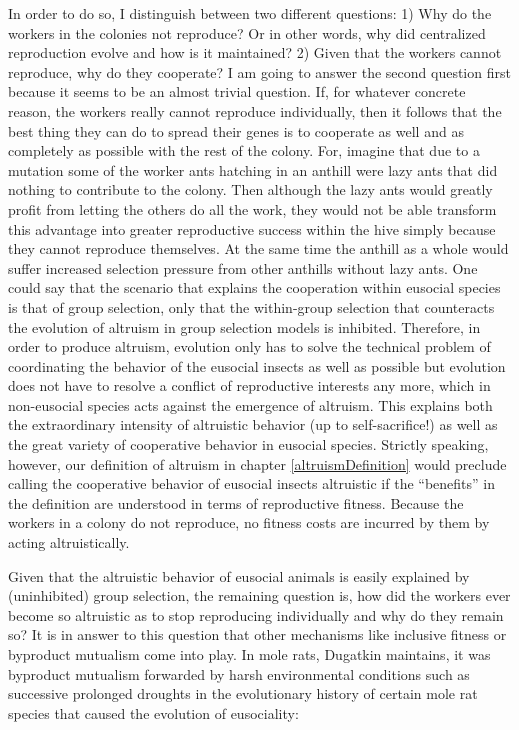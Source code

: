 In order to do so, I distinguish between two different questions: 1) Why
do the workers in the colonies not reproduce? Or in other words,
why did centralized reproduction evolve and how is it maintained? 2) Given
that the workers cannot reproduce, why do they cooperate? I am
going to answer the second question first because it seems to be an almost
trivial question. If, for whatever concrete reason, the workers really cannot
reproduce individually, then it follows that the best thing they can
do to spread their genes is to cooperate as well and as completely as possible
with the rest of the colony. For, imagine that due to a mutation some of the
worker ants hatching in an anthill were lazy ants that did nothing to
contribute to the colony. Then although the lazy ants would greatly profit
from letting the others do all the work, they would not be able transform this
advantage into greater reproductive success within the hive simply because
they cannot reproduce themselves. At the same time the anthill as a whole
would suffer increased selection pressure from other anthills without lazy
ants. One could say that the scenario that explains the cooperation within
eusocial species is that of group selection, only that the within-group
selection that counteracts the evolution of altruism in group selection models
is inhibited.  Therefore, in order to produce altruism, evolution only has to
solve the technical problem of coordinating the behavior of the eusocial
insects as well as possible but evolution does not have to resolve a conflict
of reproductive interests any more, which in non-eusocial species acts against
the emergence of altruism. This explains both the extraordinary intensity of
altruistic behavior (up to self-sacrifice!)  as well as the great variety of
cooperative behavior in eusocial species.  Strictly speaking, however, our
definition of altruism in chapter \ref{altruismDefinition} would preclude
calling the cooperative behavior of eusocial insects altruistic if the
``benefits'' in the definition are understood in terms of reproductive
fitness. Because the workers in a colony do not reproduce, no
fitness costs are incurred by them by acting altruistically.

Given that the altruistic behavior of eusocial animals is easily explained by
(uninhibited) group selection, the remaining question is, how did the workers
ever become so altruistic as to stop reproducing individually and
why do they remain so? It is in answer to this question that other mechanisms
like inclusive fitness or byproduct mutualism come into play. In mole rats,
Dugatkin maintains, it was byproduct mutualism forwarded by harsh
environmental conditions such as successive prolonged droughts in the
evolutionary history of certain mole rat species that caused the evolution of
eusociality:

